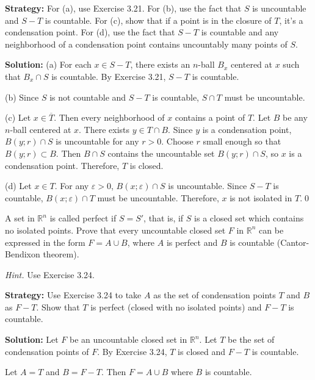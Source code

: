 \noindent\textbf{Strategy:} For (a), use Exercise 3.21. For (b), use the fact that $S$ is uncountable and $S-T$ is countable. For (c), show that if a point is in the closure of $T$, it's a condensation point. For (d), use the fact that $S-T$ is countable and any neighborhood of a condensation point contains uncountably many points of $S$.

\bigskip\noindent\textbf{Solution:} 
(a) For each $x \in S - T$, there exists an $n$-ball $B_x$ centered at $x$ such that $B_x \cap S$ is countable. By Exercise 3.21, $S - T$ is countable.

(b) Since $S$ is not countable and $S - T$ is countable, $S \cap T$ must be uncountable.

(c) Let $x \in \overline{T}$. Then every neighborhood of $x$ contains a point of $T$. Let $B$ be any $n$-ball centered at $x$. There exists $y \in T \cap B$. Since $y$ is a condensation point, $B(y;r) \cap S$ is uncountable for any $r > 0$. Choose $r$ small enough so that $B(y;r) \subset B$. Then $B \cap S$ contains the uncountable set $B(y;r) \cap S$, so $x$ is a condensation point. Therefore, $T$ is closed.

(d) Let $x \in T$. For any $\varepsilon > 0$, $B(x;\varepsilon) \cap S$ is uncountable. Since $S - T$ is countable, $B(x;\varepsilon) \cap T$ must be uncountable. Therefore, $x$ is not isolated in $T$.\qed


\begin{problembox}
A set in \( \mathbb{R}^n \) is called perfect if \( S = S' \), that is, if \( S \) is a closed set which contains no isolated points. Prove that every uncountable closed set \( F \) in \( \mathbb{R}^n \) can be expressed in the form \( F = A \cup B \), where \( A \) is perfect and \( B \) is countable (Cantor-Bendixon theorem).

\textit{Hint.} Use Exercise 3.24.
\end{problembox}

\noindent\textbf{Strategy:} Use Exercise 3.24 to take $A$ as the set of condensation points $T$ and $B$ as $F-T$. Show that $T$ is perfect (closed with no isolated points) and $F-T$ is countable.

\bigskip\noindent\textbf{Solution:} Let $F$ be an uncountable closed set in $\mathbb{R}^n$. Let $T$ be the set of condensation points of $F$. By Exercise 3.24, $T$ is closed and $F - T$ is countable.

Let $A = T$ and $B = F - T$. Then $F = A \cup B$ where $B$ is countable.

